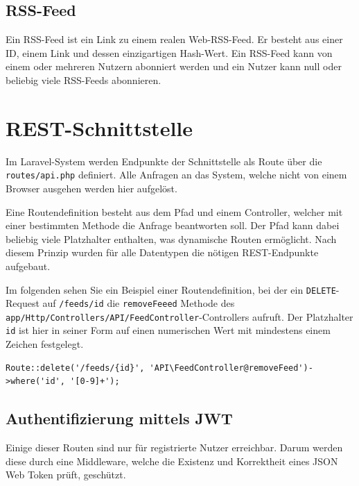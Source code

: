     \subsection{RSS-Feed}
        Ein RSS-Feed ist ein Link zu einem realen Web-RSS-Feed. Er besteht aus einer ID, einem Link und dessen einzigartigen Hash-Wert. Ein RSS-Feed kann von einem oder mehreren Nutzern abonniert werden und ein Nutzer kann null oder beliebig viele RSS-Feeds abonnieren.
    

\section{REST-Schnittstelle}

    Im Laravel-System werden Endpunkte der Schnittstelle als Route über die \texttt{routes/api.php} definiert. Alle Anfragen an das System, welche nicht von einem Browser ausgehen werden hier aufgelöst.
    
    Eine Routendefinition besteht aus dem Pfad und einem Controller, welcher mit einer bestimmten Methode die Anfrage beantworten soll. Der Pfad kann dabei beliebig viele Platzhalter enthalten, was dynamische Routen ermöglicht. Nach diesem Prinzip wurden für alle Datentypen die nötigen REST-Endpunkte aufgebaut.
    
    Im folgenden sehen Sie ein Beispiel einer Routendefinition, bei der ein \texttt{DELETE}-Request auf \texttt{/feeds/{id}} die \texttt{removeFeeed} Methode des \texttt{app/Http/Controllers/API/FeedController}-Controllers aufruft. Der Platzhalter \texttt{{id}} ist hier in seiner Form auf einen numerischen Wert mit mindestens einem Zeichen festgelegt.

    \begin{lstlisting}
Route::delete('/feeds/{id}', 'API\FeedController@removeFeed')->where('id', '[0-9]+');
    \end{lstlisting}
    
    \subsection{Authentifizierung mittels JWT}
        Einige dieser Routen sind nur für registrierte Nutzer erreichbar. Darum werden diese durch eine Middleware, welche die Existenz und Korrektheit eines JSON Web Token prüft, geschützt. 
        
